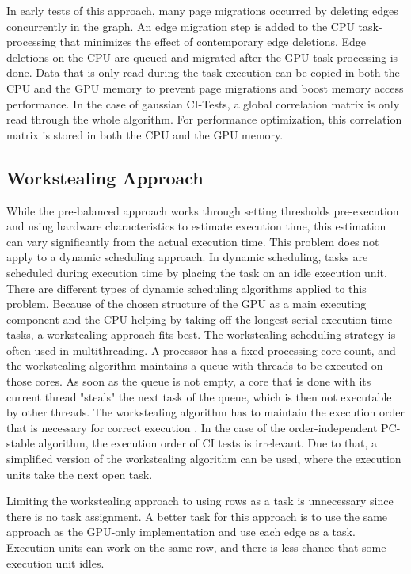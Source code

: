 In early tests of this approach, many page migrations occurred by deleting edges concurrently in the graph. An edge migration step is added to the CPU task-processing that minimizes the effect of contemporary edge deletions. Edge deletions on the CPU are queued and migrated after the GPU task-processing is done.
Data that is only read during the task execution can be copied in both the CPU and the GPU memory to prevent page migrations and boost memory access performance. In the case of gaussian CI-Tests, a global correlation matrix is only read through the whole algorithm. For performance optimization, this correlation matrix is stored in both the CPU and the GPU memory.

\subsection{Workstealing Approach}
While the pre-balanced approach works through setting thresholds pre-execution and using hardware characteristics to estimate execution time, this estimation can vary significantly from the actual execution time. This problem does not apply to a dynamic scheduling approach. In dynamic scheduling, tasks are scheduled during execution time by placing the task on an idle execution unit. There are different types of dynamic scheduling algorithms applied to this problem.
Because of the chosen structure of the GPU as a main executing component and the CPU helping by taking off the longest serial execution time tasks, a workstealing approach fits best. The workstealing scheduling strategy is often used in multithreading. A processor has a fixed processing core count, and the workstealing algorithm maintains a queue with threads to be executed on those cores. As soon as the queue is not empty, a core that is done with its current thread "steals" the next task of the queue, which is then not executable by other threads. The workstealing algorithm has to maintain the execution order that is necessary for correct execution \cite{blumofeSchedulingMultithreadedComputations1999}.
In the case of the order-independent PC-stable algorithm, the execution order of CI tests is irrelevant. Due to that, a simplified version of the workstealing algorithm can be used, where the execution units take the next open task.

Limiting the workstealing approach to using rows as a task is unnecessary since there is no task assignment. A better task for this approach is to use the same approach as the GPU-only implementation and use each edge as a task. Execution units can work on the same row, and there is less chance that some execution unit idles.

